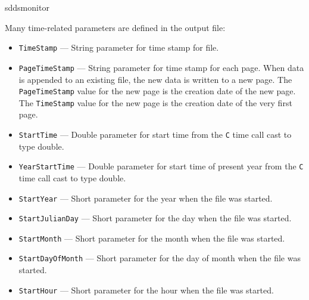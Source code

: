 \begin{sddsprog}{sddsmonitor}
\begin{itemize}
Many time-related parameters are defined in the output file:
\begin{itemize}
        \item {\tt TimeStamp} --- String parameter for time stamp for file.
        \item {\tt PageTimeStamp} --- String parameter for time stamp for each page. When data
                is appended to an existing file, the new data is written to a new
                page. The {\tt PageTimeStamp} value for the new page is the creation
                date of the new page. The {\tt TimeStamp} value for the new page is the creation 
                date of the very first page.
        \item {\tt StartTime} --- Double parameter for start time from the {\tt C} time call cast to type double.
        \item {\tt YearStartTime} --- Double parameter for start time of present year from the {\tt C} time call cast to type double.
        \item {\verb+StartYear+} --- Short parameter for the year when the file was started.
        \item {\verb+StartJulianDay+} --- Short parameter for the day when the file was started.
        \item {\verb+StartMonth+} --- Short parameter for the month when the file was started.
        \item {\verb+StartDayOfMonth+} --- Short parameter for the day of month when the file was started.
        \item {\verb+StartHour+} --- Short parameter for the hour when the file was started.
\end{itemize}
\end{itemize}


\end{sddsprog}
